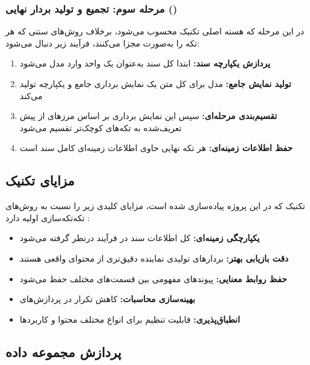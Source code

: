 \documentclass[11pt, a4paper, oneside]{book}
\begin{document}
	\subsubsection{مرحله سوم: تجمیع و تولید بردار نهایی ()}

	در این مرحله که هسته اصلی تکنیک  محسوب می‌شود، برخلاف روش‌های سنتی که هر تکه را به‌صورت مجزا  می‌کنند، فرآیند زیر دنبال می‌شود:

	\begin{enumerate}
		\item \textbf{پردازش یکپارچه سند:} ابتدا کل سند به‌عنوان یک واحد وارد مدل  می‌شود
		\item \textbf{تولید نمایش جامع:} مدل برای کل متن یک نمایش برداری جامع و یکپارچه تولید می‌کند
		\item \textbf{تقسیم‌بندی مرحله‌ای:} سپس این نمایش برداری بر اساس مرزهای از پیش تعریف‌شده به تکه‌های کوچک‌تر تقسیم می‌شود
		\item \textbf{حفظ اطلاعات زمینه‌ای:} هر تکه نهایی حاوی اطلاعات زمینه‌ای کامل سند است
	\end{enumerate}

	\subsection{مزایای تکنیک }

	تکنیک  که در این پروژه پیاده‌سازی شده است، مزایای کلیدی زیر را نسبت به روش‌های تکه‌تکه‌سازی اولیه دارد \cite{edge_local_2024}:

	\begin{itemize}
		\item \textbf{یکپارچگی زمینه‌ای:} کل اطلاعات سند در فرآیند  درنظر گرفته می‌شود
		\item \textbf{دقت بازیابی بهتر:} بردارهای تولیدی نماینده دقیق‌تری از محتوای واقعی هستند
		\item \textbf{حفظ روابط معنایی:} پیوندهای مفهومی بین قسمت‌های مختلف حفظ می‌شود  
		\item \textbf{بهینه‌سازی محاسبات:} کاهش تکرار در پردازش‌های 
		\item \textbf{انطباق‌پذیری:} قابلیت تنظیم برای انواع مختلف محتوا و کاربردها
	\end{itemize}

	\subsection{پردازش مجموعه داده }
\end{document}
